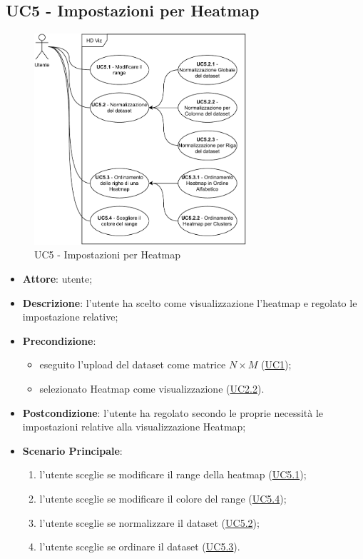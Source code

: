 \subsection{UC5 - Impostazioni per Heatmap}
    \label{uc5}
    
    \begin{figure}[htbp]
        \centering
        \includegraphics[width=0.7\textwidth]{source/sections/casi-uso/diagrams/uc5.pdf}
        \caption{UC5 - Impostazioni per Heatmap}
        \label{fig:uc5}
    \end{figure}
    
    \begin{itemize}
    \item \textbf{Attore}: utente;
    \item \textbf{Descrizione}: l'utente ha scelto come visualizzazione l'heatmap e regolato le impostazione relative;
    \item \textbf{Precondizione}: 
    \begin{itemize}
        \item eseguito l'upload del dataset come matrice $N\times M$ (\hyperref[uc1]{UC1});
        \item selezionato Heatmap come visualizzazione (\hyperref[uc2.2]{UC2.2}).
    \end{itemize}  
    \item \textbf{Postcondizione}: l'utente ha regolato secondo le proprie necessità le impostazioni relative alla visualizzazione Heatmap;
    \item \textbf{Scenario Principale}: 
    \begin{enumerate}
        \item l'utente sceglie se modificare il range della heatmap (\hyperref[uc5.1]{UC5.1});
        \item l'utente sceglie se modificare il colore del range (\hyperref[uc5.4]{UC5.4});
        \item l'utente sceglie se normalizzare il dataset (\hyperref[uc5.2]{UC5.2});
        \item l'utente sceglie se ordinare il dataset (\hyperref[uc5.3]{UC5.3}).
    \end{enumerate}  
    \end{itemize}

